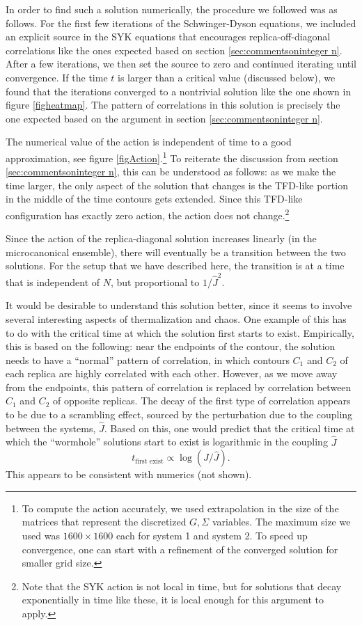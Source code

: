 \documentclass[12pt]{article}
\newcommand{\be}{\begin{equation}}
\newcommand{\ee}{\end{equation}}
\numberwithin{equation}{section}
\begin{document}
In order to find such a  solution numerically, the procedure we followed was as follows. For the first few iterations of the Schwinger-Dyson equations, we included an explicit source in the SYK equations that encourages replica-off-diagonal correlations like the ones expected based on section \ref{sec:commentsoninteger n}. After a few iterations, we then set the source to zero and continued iterating until convergence. If the time $t$ is larger than a critical value (discussed below), we found that the iterations converged to a nontrivial solution like the one shown in figure \ref{figheatmap}. The pattern of correlations in this solution is precisely the one expected based on the argument in section \ref{sec:commentsoninteger n}. 

The numerical value of the action is independent of time to a good approximation, see figure \ref{figAction}.\footnote{To compute the action accurately, we used extrapolation in the size of the matrices that represent the discretized $G,\Sigma$ variables. The maximum size we used was $1600\times 1600$ each for system 1 and system 2. To speed up convergence, one can start with a refinement of the converged solution for smaller grid size.} To reiterate the discussion from section \ref{sec:commentsoninteger n}, this can be understood as follows: as we make the time larger, the only aspect of the solution that changes is the TFD-like portion in the middle of the time contours gets extended. Since this TFD-like configuration has exactly zero action, the action does not change.\footnote{Note that the SYK action is not local in time, but for solutions that decay exponentially in time like these, it is local enough for this argument to apply.}

Since the action of the replica-diagonal solution increases linearly (in the microcanonical ensemble), there will eventually be a transition between the two solutions. For the setup that we have described here, the transition is at a time that is independent of $N$, but proportional to $1/\hat{J}^2$.

It would be desirable to understand this solution better, since it seems to involve several interesting aspects of thermalization and chaos. One example of this has to do with the critical time at which the solution first starts to exist. Empirically, this is based on the following: near the endpoints of the contour, the solution needs to have a ``normal'' pattern of correlation, in which contours $C_1$ and $C_2$ of each replica are highly correlated with each other. However, as we move away from the endpoints, this pattern of correlation is replaced by correlation between $C_1$ and $C_2$ of opposite replicas. The decay of the first type of correlation appears to be due to a scrambling effect, sourced by the perturbation due to the coupling between the systems, $\hat{J}$. Based on this, one would predict that the critical time at which the ``wormhole'' solutions start to exist is logarithmic in the coupling $\hat{J}$
\be
t_{\text{first exist}} \propto \log(J/\widehat{J}).
\ee
This appears to be consistent with numerics (not shown).
\end{document}
